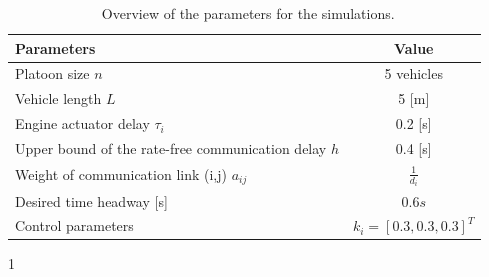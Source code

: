 \documentclass[a4paper]{cas-sc}
\begin{document}
\begin{table}
  \centering
  \setlength{\abovecaptionskip}{0pt}
  \setlength{\belowcaptionskip}{10pt}%
  \begin{threeparttable}[b]
    \caption{~Overview of the parameters for the simulations.}
    \label{table1}
    {\begin{tabular}{lc} \toprule
        Parameters                              & Value                \\ \midrule
        Platoon size $n$                        & 5 vehicles           \\
        Vehicle length $L$                      & 5 [m]                \\
        Engine actuator delay $\tau_i$                     & 0.2 [s] \tnote{1}   \\
        Upper bound of the rate-free communication delay $h$ & 0.4 [s]              \\
        Weight of communication link (i,j) $a_{ij}$                 &  $\frac{1}{d_i}$ \\
        Desired time headway [s] & $0.6s$\\
        Control parameters & $k_i=[0.3,0.3,0.3]^T$ \\
        \bottomrule
      \end{tabular}}
    \begin{tablenotes}
      \item[1] \citep{Wang2018a,Zhou2020}
    \end{tablenotes}
  \end{threeparttable}
\end{table}
\end{document}
